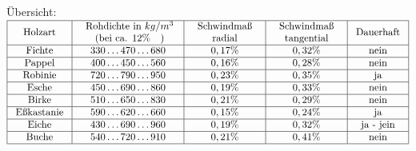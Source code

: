 \documentclass[fleqn,twoside]{article}
\begin{document}
\begin{itemize}
\begin{itemize}
\begin{itemize}
                        \end{itemize}
                \end{itemize}
                Übersicht: \vspace*{3mm}\\
                    $\begin{array}{|c|c|c|c|c|}
                        \hline \text { Holzart } & \begin{array}{c}
                        \text { Rohdichte in } k g / m^3 \\
                        \text { (bei ca. 12\% ~ )} 
                        \end{array} & \begin{array}{c}
                        \text { Schwindmaß } \\
                        \text { radial }
                        \end{array} & \begin{array}{c}
                        \text { Schwindmaß } \\
                        \text { tangential }
                        \end{array} & \text { Dauerhaft } \\
                        \hline \text { Fichte } & 330 \ldots 470 \ldots 680 & 0,17 \% & 0,32 \% & \text { nein } \\
                        \hline \text { Pappel } & 400 \ldots 450 \ldots 560 & 0,16 \% & 0,28 \% & \text { nein } \\
                        \hline \text { Robinie } & 720 \ldots 790 \ldots 950 & 0,23 \% & 0,35 \% & \text { ja } \\
                        \hline \text { Esche } & 450 \ldots 690 \ldots 860 & 0,19 \% & 0,33 \% & \text { nein } \\
                        \hline \text { Birke } & 510 \ldots 650 \ldots 830 & 0,21 \% & 0,29 \% & \text { nein } \\
                        \hline \text { Eßkastanie } & 590 \ldots 620 \ldots 660 & 0,15 \% & 0,24 \% & \text { ja } \\
                        \hline \text { Eiche } & 430 \ldots 690 \ldots 960 & 0,19 \% & 0,32 \% & \text { ja - jein } \\
                        \hline \text { Buche } & 540 \ldots 720 \ldots 910 & 0,21 \% & 0,41 \% & \text { nein } \\
                        \hline
                    \end{array}$

\end{itemize}
\end{document}
